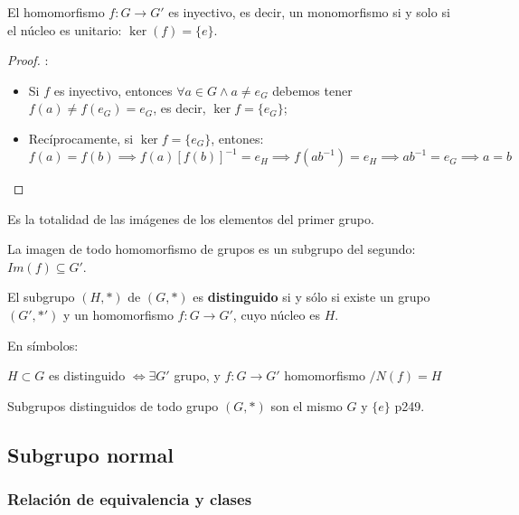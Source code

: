 	\begin{proposition}
		El homomorfismo $f: G \rightarrow G'$ es inyectivo, es decir, un monomorfismo si y solo si el núcleo es unitario: $\ker(f) = \{ e\}$.
	\end{proposition}
	\begin{proof}:
		\begin{itemize}
			\item Si $f$ es inyectivo, entonces $\forall a \in G \land a \ne e_G$ debemos tener $f(a) \ne f(e_G) = e_G$, es decir, $\ker f = \{e_G\}$;
			\item Recíprocamente, si $\ker f = \{ e_G\}$, entones: $f(a) = f(b) \implies f(a) \left[f(b)\right]^{-1} = e_H \implies f(ab^{-1}) = e_H \implies ab^{-1}=e_G \implies a=b$
		\end{itemize}
	\end{proof}


	\begin{fmd-definition}  
		Es la totalidad de las imágenes de los elementos del primer grupo.
	\end{fmd-definition}
	
	\begin{proposition}
		La imagen de todo homomorfismo de grupos es un subgrupo del segundo: $Im(f) \subseteq G'$.
	\end{proposition}


	\begin{definition} 
		El subgrupo $(H, *)$ de $(G, *)$ es \textbf{distinguido} si y sólo si existe un grupo $(G', *')$ y un homomorfismo $f: G \rightarrow G'$, cuyo núcleo es $H$.
		
		En símbolos:
		
		$H \subset G$ es distinguido $\iff \exists G'$ grupo, y $f:G \rightarrow G'$ homomorfismo $/ N(f) = H$
	\end{definition}
	
	Subgrupos distinguidos de todo grupo $(G, *)$ son el mismo $G$ y $\{e\}$ \cite{rojoAlgebra8vaEd} p249.

\subsection{Subgrupo normal} \label{sec:subgrupo_normal}

	\subsubsection{Relación de equivalencia y clases}
	
